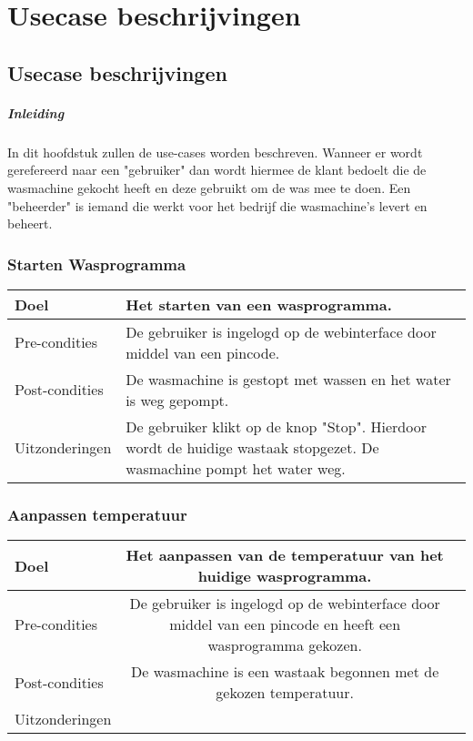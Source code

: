 \chapter{Usecase beschrijvingen}
\section{Usecase beschrijvingen}
\paragraph{Inleiding}
In dit hoofdstuk zullen de use-cases worden beschreven.
Wanneer er wordt gerefereerd naar een "gebruiker" dan wordt hiermee de klant bedoelt die de wasmachine gekocht heeft en deze gebruikt om de was mee te doen.
Een "beheerder" is iemand die werkt voor het bedrijf die wasmachine's levert en beheert.

\subsection{Starten Wasprogramma}
\begin{center}
  \begin{tabular}{ | p{4cm} | p{8.5cm} | } %
    \hline
    Doel & Het starten van een wasprogramma. \\ \hline
    Pre-condities & De gebruiker is ingelogd op de webinterface door middel van een pincode. \\ \hline
    Post-condities & De wasmachine is gestopt met wassen en het water is weg gepompt. \\ \hline
    Uitzonderingen & De gebruiker klikt op de knop "Stop". Hierdoor wordt de huidige wastaak stopgezet. De wasmachine pompt het water weg. \\
    \hline
  \end{tabular}
\end{center}

\subsection{Aanpassen temperatuur}
\begin{center}
  \begin{tabular}{ l | c | r | }
    \hline
    Doel & Het aanpassen van de temperatuur van het huidige wasprogramma. \\ \hline
    Pre-condities & De gebruiker is ingelogd op de webinterface door middel van een pincode en heeft een wasprogramma gekozen. \\ \hline
    Post-condities & De wasmachine is een wastaak begonnen met de gekozen temperatuur. \\ \hline
    Uitzonderingen &  \\
    \hline
  \end{tabular}
\end{center}

